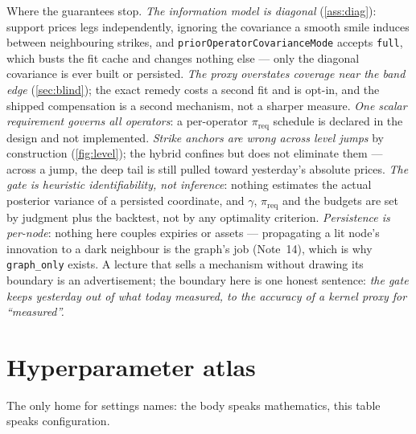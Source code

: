 \documentclass[11pt]{article}
\begin{document}
Where the guarantees stop.  \emph{The information model is diagonal}
(\cref{ass:diag}): support prices legs independently, ignoring the
covariance a smooth smile induces between neighbouring strikes, and
\texttt{priorOperatorCovarianceMode} accepts \texttt{full}, which busts
the fit cache and changes nothing else --- only the diagonal covariance
is ever built or persisted.  \emph{The proxy overstates
coverage near the band edge} (\cref{sec:blind}); the exact remedy
costs a second fit and is opt-in, and the shipped compensation is a
second mechanism, not a sharper measure.  \emph{One scalar
requirement governs all operators}: a per-operator
$\pi_{\mathrm{req}}$ schedule is declared in the design and not
implemented.  \emph{Strike anchors are wrong across level jumps} by
construction (\cref{fig:level}); the hybrid confines but does not
eliminate them --- across a jump, the deep tail is still pulled
toward yesterday's absolute prices.  \emph{The gate is heuristic
identifiability, not inference}: nothing estimates the actual
posterior variance of a persisted coordinate, and $\gamma$,
$\pi_{\mathrm{req}}$ and the budgets are set by judgment plus the
backtest, not by any optimality criterion.  \emph{Persistence is
per-node}: nothing here couples expiries or assets --- propagating a
lit node's innovation to a dark neighbour is the graph's job
(Note~14), which is why \texttt{graph\_only} exists.  A lecture that
sells a mechanism without drawing its boundary is an advertisement;
the boundary here is one honest sentence: \emph{the gate keeps
yesterday out of what today measured, to the accuracy of a kernel
proxy for ``measured''.}

\appendix
\section{Hyperparameter atlas}
\label{app:atlas}

The only home for settings names: the body speaks mathematics, this
table speaks configuration.
\end{document}
